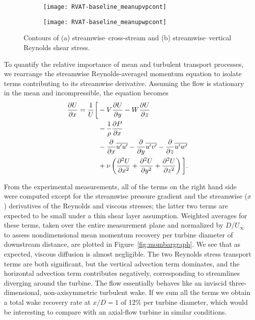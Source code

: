 \begin{figure}
    \centering

    \begin{subfigure}{\textwidth}
        \centering
        \texttt{[image: RVAT-baseline\_meanupvpcont]}
        \caption{}
        \label{fig:RVAT-baseline-uvcont}
    \end{subfigure}

    \begin{subfigure}{\textwidth}
        \centering
        \texttt{[image: RVAT-baseline\_meanupwpcont]}
        \caption{}
        \label{fig:RVAT-baseline-uwcont}
    \end{subfigure}

    \caption{Contours of (a) streamwise--cross-stream and (b)
        streamwise--vertical Reynolds shear stress.}

    \label{fig:Re-stress}
\end{figure}

To quantify the relative importance of mean and turbulent transport processes,
we rearrange the streamwise Reynolds-averaged momentum equation to isolate terms
contributing to its streamwise derivative. Assuming the flow is stationary in
the mean and incompressible, the equation becomes
\begin{equation}
    \begin{split}
        \frac{\partial U}{\partial x}  =
        \frac{1}{U} \bigg{[}
        & - V\frac{\partial U}{\partial y}
        - W\frac{\partial U}{\partial z} \\
        & -\frac{1}{\rho}\frac{\partial P}{\partial x} \\
        & - \frac{\partial}{\partial x} \overline{u'u'}
        - \frac{\partial}{\partial y} \overline{u'v'}
        - \frac{\partial}{\partial z} \overline{u'w'} \\
        & + \nu\left(\frac{\partial^2 U}{\partial x^2}
        + \frac{\partial^2 U}{\partial y^2}
        + \frac{\partial^2 U}{\partial z^2} \right)
        \bigg{]}.
    \end{split}
\label{eq:momentum}
\end{equation}

From the experimental measurements, all of the terms on the right hand side were
computed except for the streamwise pressure gradient and the streamwise ($x$)
derivatives of the Reynolds and viscous stresses; the latter two terms are
expected to be small under a thin shear layer assumption. Weighted averages for
these terms, taken over the entire measurement plane and normalized by
$D/U_\infty$ to assess nondimensional mean momentum recovery per turbine
diameter of downstream distance, are plotted in Figure~\ref{fig:mombargraph}. We
see that as expected, viscous diffusion is almost negligible. The two Reynolds
stress transport terms are both significant, but the vertical advection term
dominates, and the horizontal advection term contributes negatively,
corresponding to streamlines diverging around the turbine. The flow essentially
behaves like an inviscid three-dimensional, non-axisymmetric turbulent wake. If
we sum all the terms we obtain a total wake recovery rate at $x/D=1$ of 12\% per
turbine diameter, which would be interesting to compare with an axial-flow
turbine in similar conditions.

